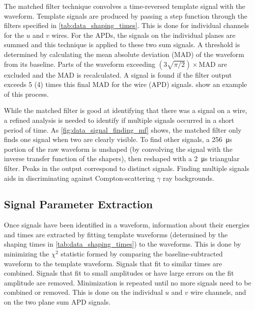 \documentclass[herrin-thesis.tex]{subfiles}
\begin{document}
The matched filter technique\cite{North:1963fk} convolves a time-reversed template signal with the waveform. Template signals are produced by passing a step function through the filters specified in \cref{tab:data_shaping_times}. This is done for individual channels for the \(u\) and \(v\) wires. For the APDs, the signals on the individual planes are summed and this technique is applied to these two sum signals. A threshold is determined by calculating the mean absolute deviation (MAD) of the waveform from its baseline. Parts of the waveform exceeding \((3\sqrt{\pi/2})\times\text{MAD}\) are excluded and the MAD is recalculated. A signal is found if the filter output exceeds 5 (4) times this final MAD for the wire (APD) signals.  show an example of this process.

While the matched filter is good at identifying that there was a signal on a wire, a refined analysis is needed to identify if multiple signals occurred in a short period of time. As \cref{fig:data_signal_finding_mf} shows, the matched filter only finds one signal when two are clearly visible. To find other signals, a \SI{256}{\micro\s} portion of the raw waveform is unshaped (by convolving the signal with the inverse transfer function of the shapers), then reshaped with a \SI{2}{\micro\s} triangular filter. Peaks in the output correspond to distinct signals. Finding multiple signals aids in discriminating against Compton-scattering \(\gamma\) ray backgrounds.

\subsection{Signal Parameter Extraction}
\label{sec:data_signal_extraction}
Once signals have been identified in a waveform, information about their energies and times are extracted by fitting template waveforms (determined by the shaping times in \cref{tab:data_shaping_times}) to the waveforms. This is done by minimizing the \(\chi^2\) statistic formed by comparing the baseline-subtracted waveform to the template waveform. Signals that fit to similar times are combined. Signals that fit to small amplitudes or have large errors on the fit amplitude are removed. Minimization is repeated until no more signals need to be combined or removed. This is done on the individual \(u\) and \(v\) wire channels, and on the two plane sum APD signals.
\end{document}
